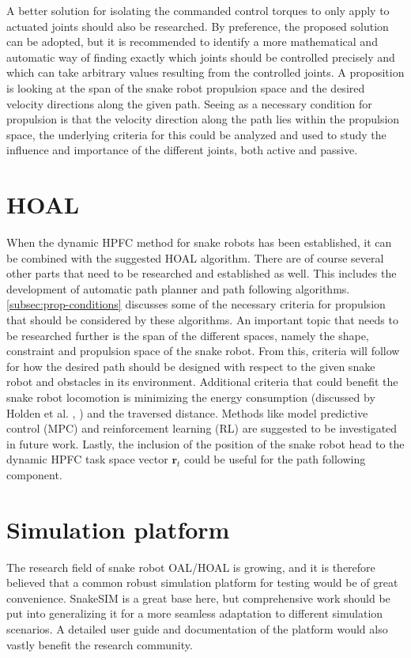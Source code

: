 A better solution for isolating the commanded control torques to only apply to actuated joints should also be researched. By preference, the proposed solution can be adopted, but it is recommended to identify a more mathematical and automatic way of finding exactly which joints should be controlled precisely and which can take arbitrary values resulting from the controlled joints. A proposition is looking at the span of the snake robot propulsion space and the desired velocity directions along the given path. Seeing as a necessary condition for propulsion is that the velocity direction along the path lies within the propulsion space, the underlying criteria for this could be analyzed and used to study the influence and importance of the different joints, both active and passive.


\section{HOAL}

When the dynamic HPFC method for snake robots has been established, it can be combined with the suggested HOAL algorithm. There are of course several other parts that need to be researched and established as well. This includes the development of automatic path planner and path following algorithms. \ref{subsec:prop-conditions} discusses some of the necessary criteria for propulsion that should be considered by these algorithms. An important topic that needs to be researched further is the span of the different spaces, namely the shape, constraint and propulsion space of the snake robot. From this, criteria will follow for how the desired path should be designed with respect to the given snake robot and obstacles in its environment. Additional criteria that could benefit the snake robot locomotion is minimizing the energy consumption (discussed by Holden et al. \cite{holden2013optimal}, \cite{holden2014optimal}) and the traversed distance. Methods like model predictive control (MPC) and reinforcement learning (RL) are suggested to be investigated in future work. Lastly, the inclusion of the position of the snake robot head to the dynamic HPFC task space vector $\mathbf{r}_t$ could be useful for the path following component.

\section{Simulation platform}

The research field of snake robot OAL/HOAL is growing, and it is therefore believed that a common robust simulation platform for testing would be of great convenience. SnakeSIM is a great base here, but comprehensive work should be put into generalizing it for a more seamless adaptation to different simulation scenarios. A detailed user guide and documentation of the platform would also vastly benefit the research community.